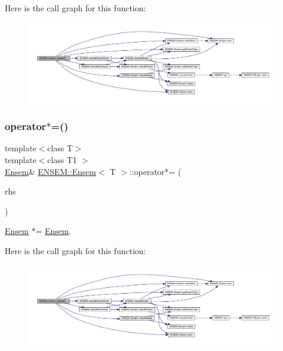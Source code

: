 Here is the call graph for this function\+:
\nopagebreak
\begin{figure}[H]
\begin{center}
\leavevmode
\includegraphics[width=350pt]{d7/d3e/classENSEM_1_1Ensem_ae6590e101b18547ec3d2682ecbea0371_cgraph}
\end{center}
\end{figure}
\mbox{\label{classENSEM_1_1Ensem_ae6590e101b18547ec3d2682ecbea0371}} 
\subsubsection{\texorpdfstring{operator$\ast$=()}{operator*=()}\hspace{0.1cm}{\footnotesize\ttfamily [4/4]}}
{\footnotesize\ttfamily template$<$class T$>$ \\
template$<$class T1 $>$ \\
\mbox{\hyperlink{classENSEM_1_1Ensem}{Ensem}}\& \mbox{\hyperlink{classENSEM_1_1Ensem}{E\+N\+S\+E\+M\+::\+Ensem}}$<$ T $>$\+::operator$\ast$= (\begin{DoxyParamCaption}\item[{const \mbox{\hyperlink{classENSEM_1_1Ensem}{Ensem}}$<$ T1 $>$ \&}]{rhs }\end{DoxyParamCaption})\hspace{0.3cm}{\ttfamily [inline]}}



\mbox{\hyperlink{classENSEM_1_1Ensem}{Ensem}} $\ast$= \mbox{\hyperlink{classENSEM_1_1Ensem}{Ensem}}. 

Here is the call graph for this function\+:
\nopagebreak
\begin{figure}[H]
\begin{center}
\leavevmode
\includegraphics[width=350pt]{d7/d3e/classENSEM_1_1Ensem_ae6590e101b18547ec3d2682ecbea0371_cgraph}
\end{center}
\end{figure}
\mbox{\label{classENSEM_1_1Ensem_a3b36653814508e90b22543a3f1b465d5}} 

